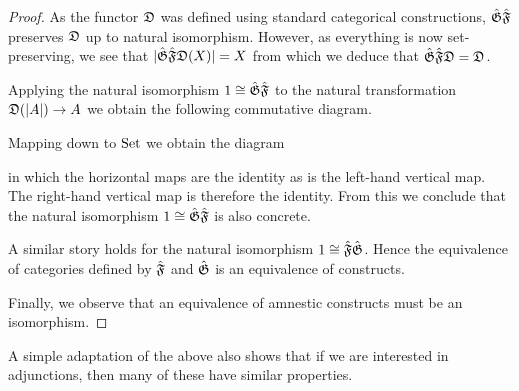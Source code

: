 \documentclass[%
12pt,%
arxiv,%
defaults
]{myclass}
\begin{document}
\begin{proof}
As the functor \(\func{D}\) was defined using standard categorical constructions, \(\hat{\func{G}}\hat{\func{F}}\) preserves \(\func{D}\) up to natural isomorphism.
However, as everything is now set\hyp{}preserving, we see that \(\sabs{\hat{\func{G}} \hat{\func{F}} \func{D}(X)} = X\) from which we deduce that \(\hat{\func{G}}\hat{\func{F}}\func{D} = \func{D}\).

Applying the natural isomorphism \(1 \cong \hat{\func{G}}\hat{\func{F}}\) to the natural transformation \(\func{D}(\sabs{A}) \to A\) we obtain the following commutative diagram.
%
\begin{centre}
\end{centre}

Mapping down to \(\operatorname{Set}\) we obtain the diagram

\begin{centre}
\end{centre}

in which the horizontal maps are the identity as is the left\hyp{}hand vertical map.
The right\hyp{}hand vertical map is therefore the identity.
From this we conclude that the natural isomorphism \(1 \cong \hat{\func{G}}\hat{\func{F}}\) is also concrete.

A similar story holds for the natural isomorphism \(1 \cong \hat{\func{F}}\hat{\func{G}}\).
Hence the equivalence of categories defined by \(\hat{\func{F}}\) and \(\hat{\func{G}}\) is an equivalence of constructs.

Finally, we observe that an equivalence of amnestic constructs must be an isomorphism.
\end{proof}

A simple adaptation of the above also shows that if we are interested in adjunctions, then many of these have similar properties.
\end{document}
